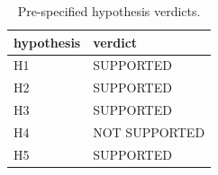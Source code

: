 \begin{table}[t]
\centering
\small
\caption{Pre-specified hypothesis verdicts.}
\label{tab:hyp}
\begin{tabular}{ll}
\toprule
hypothesis & verdict \\
\midrule
H1 & SUPPORTED \\
H2 & SUPPORTED \\
H3 & SUPPORTED \\
H4 & NOT SUPPORTED \\
H5 & SUPPORTED \\
\bottomrule
\end{tabular}
\end{table}
